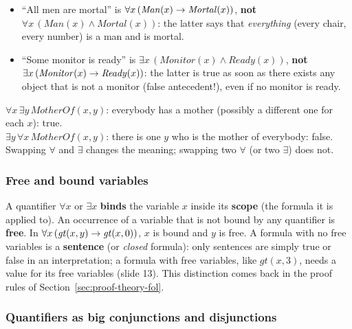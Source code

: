 \begin{nbwarning}
\begin{itemize}[nosep]
  \item ``All men are mortal'' is $\forall x\,(\mathit{Man}(x) \rightarrow \mathit{Mortal}(x))$,
        \textbf{not} $\forall x\,(\mathit{Man}(x) \land \mathit{Mortal}(x))$: the latter
        says that \emph{everything} (every chair, every number) is a man and is mortal.
  \item ``Some monitor is ready'' is $\exists x\,(\mathit{Monitor}(x) \land
        \mathit{Ready}(x))$, \textbf{not} $\exists x\,(\mathit{Monitor}(x) \rightarrow
        \mathit{Ready}(x))$: the latter is true as soon as there exists any object that is
        not a monitor (false antecedent!), even if no monitor is ready.
\end{itemize}
\end{nbwarning}

\begin{nbwarning}
\notinslides
$\forall x\,\exists y\,\mathit{MotherOf}(x, y)$: everybody has a mother (possibly a
different one for each $x$): true. \\
$\exists y\,\forall x\,\mathit{MotherOf}(x, y)$: there is one $y$ who is the mother of
everybody: false. Swapping $\forall$ and $\exists$ changes the meaning; swapping two
$\forall$ (or two $\exists$) does not.
\end{nbwarning}

\subsubsection{Free and bound variables}
\notinslides

A quantifier $\forall x$ or $\exists x$ \textbf{binds} the variable $x$ inside its
\textbf{scope} (the formula it is applied to). An occurrence of a variable that is not
bound by any quantifier is \textbf{free}. In
$\forall x\,(\mathit{gt}(x, y) \rightarrow \mathit{gt}(x, 0))$, $x$ is bound and $y$ is free.
A formula with no free variables is a \textbf{sentence} (or \emph{closed} formula): only
sentences are simply true or false in an interpretation; a formula with free variables,
like $\mathit{gt}(x, 3)$, needs a value for its free variables (slide 13). This
distinction comes back in the proof rules of Section~\ref{sec:proof-theory-fol}.

\subsubsection{Quantifiers as big conjunctions and disjunctions}

